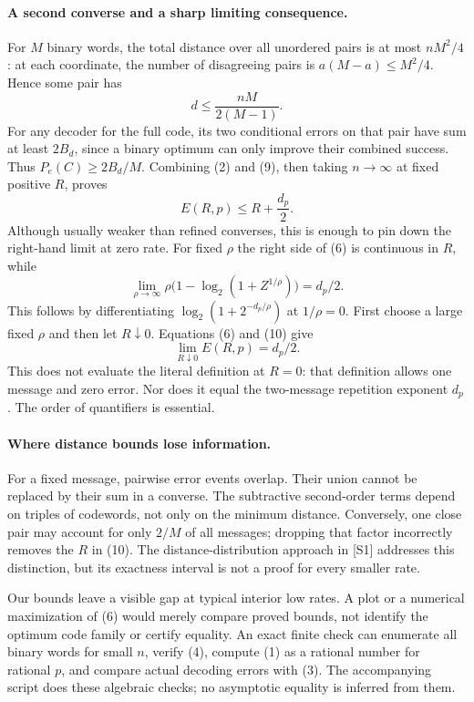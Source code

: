 \documentclass[11pt]{article}
\begin{document}
\paragraph{A second converse and a sharp limiting consequence.}
For $M$ binary words, the total distance over all unordered pairs is
at most $nM^2/4$: at each coordinate, the number of disagreeing pairs
is $a(M-a)\le M^2/4$. Hence some pair has
\[
                        d\le\frac{nM}{2(M-1)}.          \tag{9}
\]
For any decoder for the full code, its two conditional errors on that
pair have sum at least $2B_d$, since a binary optimum can only improve
their combined success. Thus $P_e(C)\ge2B_d/M$. Combining (2) and
(9), then taking $n\to\infty$ at fixed positive $R$, proves
\[
                         E(R,p)\le R+\frac{d_p}{2}.      \tag{10}
\]
Although usually weaker than refined converses, this is enough to
pin down the right-hand limit at zero rate. For fixed $\rho$ the
right side of (6) is continuous in $R$, while
\[
 \lim_{\rho\to\infty}
       \rho\bigl(1-\log_2(1+Z^{1/\rho})\bigr)=d_p/2.
\]
This follows by differentiating $\log_2(1+2^{-d_p/\rho})$ at
$1/\rho=0$. First choose a large fixed $\rho$ and then let $R\downarrow0$.
Equations (6) and (10) give
\[
                         \lim_{R\downarrow0}E(R,p)=d_p/2.\tag{11}
\]
This does not evaluate the literal definition at $R=0$: that definition
allows one message and zero error. Nor does it equal the two-message
repetition exponent $d_p$. The order of quantifiers is essential.

\paragraph{Where distance bounds lose information.}
For a fixed message, pairwise error events overlap. Their union cannot
be replaced by their sum in a converse. The subtractive second-order
terms depend on triples of codewords, not only on the minimum distance.
Conversely, one close pair may account for only $2/M$ of all messages;
dropping that factor incorrectly removes the $R$ in (10).
The distance-distribution approach in [S1] addresses this distinction,
but its exactness interval is not a proof for every smaller rate.

Our bounds leave a visible gap at typical interior low rates. A plot
or a numerical maximization of (6) would merely compare proved bounds,
not identify the optimum code family or certify equality.
An exact finite check can enumerate all binary words for small $n$,
verify (4), compute (1) as a rational number for rational $p$, and
compare actual decoding errors with (3). The accompanying script does
these algebraic checks; no asymptotic equality is inferred from them.
\end{document}

